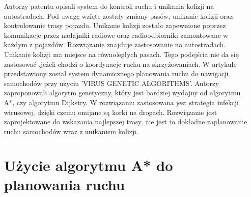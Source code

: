 \newline
\indent
Autorzy patentu \cite{broxmeyer1994vehicle} opisali system do kontroli ruchu i unikania kolizji na autostradach. Pod uwagę wzięte zostały zmiany pasów, unikanie kolizji oraz kontrolowanie trasy pojazdu. Unikanie kolizji zostało zapewnione poprzez komunikacje przez nadajniki radiowe oraz radioodbiorniki zamontowane w każdym z pojazdów. Rozwiązanie znajduje zastosowanie na autostradach. Unikanie kolizji ma miejsce na równoległych pasach. Tego podejścia nie da się zastosować ,jeżeli chodzi o koordynacje ruchu na skrzyżowaniach.
\newline
\indent
W artykule \cite{kanoh2007dynamic} przedstawiony został system dynamicznego planowania ruchu do nawigacji samochodów przy użyciu 'VIRUS GENETIC ALGORITHMS'. Autorzy zaproponowali algorytm genetyczny, który jest bardziej wydajny od algorytmu A*, czy algorytmu Dijkstry. W rozwiązaniu zastosowana jest strategia infekcji wirusowej, dzięki czemu omijane są korki na drogach. Rozwiązanie jest zaprojektowane do wskazania najlepszej trasy, nie jest to dokładne zaplanowanie ruchu samochodów wraz z unikaniem kolizji.

\section{Użycie algorytmu A* do planowania ruchu}

